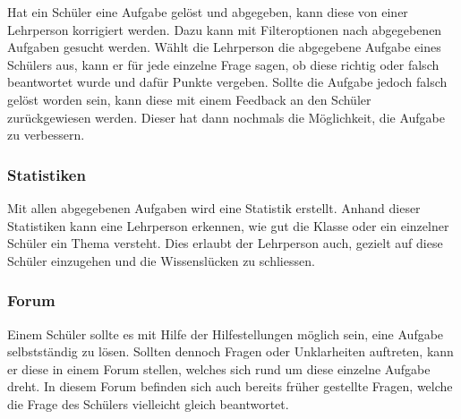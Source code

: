 Hat ein Schüler eine Aufgabe gelöst und abgegeben, kann diese von einer Lehrperson korrigiert werden. Dazu kann mit Filteroptionen nach abgegebenen Aufgaben gesucht werden. Wählt die Lehrperson die abgegebene Aufgabe eines Schülers aus, kann er für jede einzelne Frage sagen, ob diese richtig oder falsch beantwortet wurde und dafür Punkte vergeben. Sollte die Aufgabe jedoch falsch gelöst worden sein, kann diese mit einem Feedback an den Schüler zurückgewiesen werden. Dieser hat dann nochmals die Möglichkeit, die Aufgabe zu verbessern. 

\subsubsection*{Statistiken}
Mit allen abgegebenen Aufgaben wird eine Statistik erstellt. Anhand dieser Statistiken kann eine Lehrperson erkennen, wie gut die Klasse oder ein einzelner Schüler ein Thema versteht. Dies erlaubt der Lehrperson auch, gezielt auf diese Schüler einzugehen und die Wissenslücken zu schliessen.

\subsubsection*{Forum}
Einem Schüler sollte es mit Hilfe der Hilfestellungen möglich sein, eine Aufgabe selbstständig zu lösen. Sollten dennoch Fragen oder Unklarheiten auftreten, kann er diese in einem Forum stellen, welches sich rund um diese einzelne Aufgabe dreht. In diesem Forum befinden sich auch bereits früher gestellte Fragen, welche die Frage des Schülers vielleicht gleich beantwortet.


\newpage